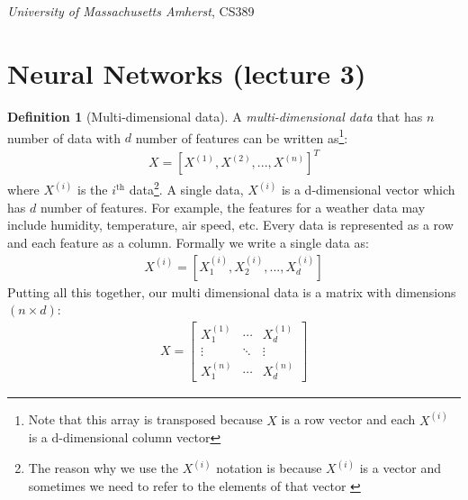 \documentclass[11pt]{article}
\numberwithin{equation}{section}
\theoremstyle{definition}%
\newtheorem{definition}{Definition}[section]%
\begin{document}
\noindent
\begin{center}
    \section*{}
    \subsection*{}
    \emph{University of Massachusetts Amherst}, CS389
\end{center}

\section{Neural Networks (lecture 3)}

\begin{definition}[Multi-dimensional data] A \emph{multi-dimensional data} that has $n$ number of data with $d$ number of features can be written as\footnote{Note that this array is transposed because $X$ is a row vector and each $X^{(i)}$ is a d-dimensional column vector}:
    \begin{align}
        X = \left [ X^{(1)}, X^{(2)}, ..., X^{(n)} \right ]^{T}
    \end{align}
where $X^{(i)}$ is the $i^{\text{th}}$ data\footnote{The reason why we use the $X^{(i)}$ notation is because $X^{(i)}$ is a vector and sometimes we need to refer to the elements of that vector \cite{MIT}}. A single data, $X^{(i)}$ is a d-dimensional vector which has $d$ number of features. For example, the features for a weather data may include humidity, temperature, air speed, etc. Every data is represented as a row and each feature as a column. Formally we write a single data as:
    \begin{align}
        X^{(i)} = \left [ X_{1}^{(i)}, X_{2}^{(i)}, ..., X_{d}^{(i)} \right ]
    \end{align}
Putting all this together, our multi dimensional data is a matrix with dimensions $(n \times d)$:
    \begin{align}
        X = \begin{bmatrix}
            X_{1}^{(1)} & \cdots & X_{d}^{(1)} \\
            \vdots & \ddots & \vdots \\
            X_{1}^{(n)} & \cdots & X_{d}^{(n)} 
        \end{bmatrix}
    \end{align}


\end{definition}
\end{document}
